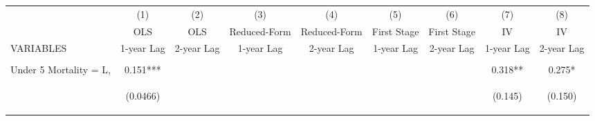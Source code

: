 \documentclass[]{article}
\begin{document}
\begin{center}
\begin{tabular}{lcccccccc} \hline
 & (1) & (2) & (3) & (4) & (5) & (6) & (7) & (8) \\
 & OLS & OLS & Reduced-Form & Reduced-Form & First Stage & First Stage & IV & IV \\
VARIABLES & 1-year Lag & 2-year Lag & 1-year Lag & 2-year Lag & 1-year Lag & 2-year Lag & 1-year Lag & 2-year Lag \\ \hline
\vspace{4pt} & \begin{footnotesize}\end{footnotesize} & \begin{footnotesize}\end{footnotesize} & \begin{footnotesize}\end{footnotesize} & \begin{footnotesize}\end{footnotesize} & \begin{footnotesize}\end{footnotesize} & \begin{footnotesize}\end{footnotesize} & \begin{footnotesize}\end{footnotesize} & \begin{footnotesize}\end{footnotesize} \\
Under 5 Mortality = L, & 0.151*** &  &  &  &  &  & 0.318** & 0.275* \\
\vspace{4pt} & \begin{footnotesize}(0.0466)\end{footnotesize} & \begin{footnotesize}\end{footnotesize} & \begin{footnotesize}\end{footnotesize} & \begin{footnotesize}\end{footnotesize} & \begin{footnotesize}\end{footnotesize} & \begin{footnotesize}\end{footnotesize} & \begin{footnotesize}(0.145)\end{footnotesize} & \begin{footnotesize}(0.150)\end{footnotesize} \\

\end{tabular}
\end{center}
\end{document}
